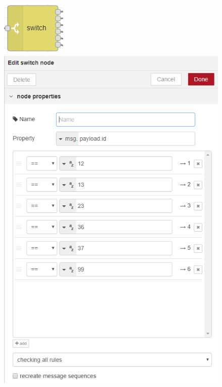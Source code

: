 \begin{itemize}
\begin{itemize}
\begin{figure}[H]
  \centering
  \begin{minipage}[b]{0.3\textwidth}
    \includegraphics[width=\textwidth]{figuras/switchNode.png}
  \end{minipage}
  \hfill
  \begin{minipage}[b]{0.5\textwidth}
    \includegraphics[width=\textwidth]{figuras/switchNodeProp.png}

\end{minipage}
\end{figure}
\end{itemize}
\end{itemize}
